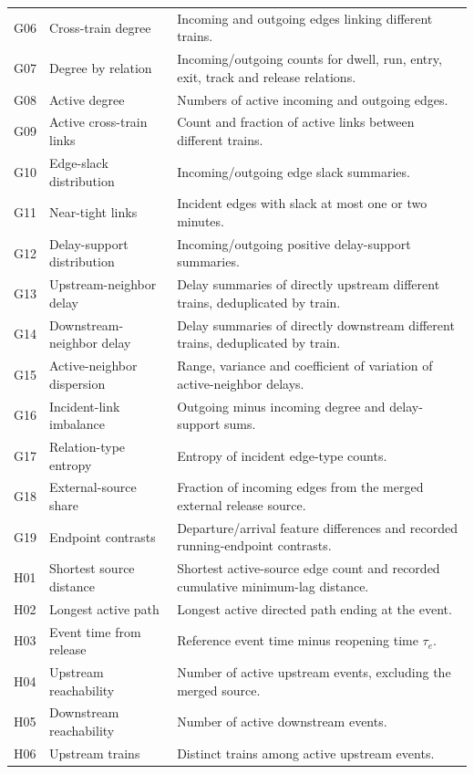 \begin{longtable}{@{}>{\raggedright\arraybackslash}p{0.8cm}>{\raggedright\arraybackslash}p{3.7cm}>{\raggedright\arraybackslash}p{10.0cm}@{}}
G06 & Cross-train degree & Incoming and outgoing edges linking different trains. \\
G07 & Degree by relation & Incoming/outgoing counts for dwell, run, entry, exit, track and release relations. \\
G08 & Active degree & Numbers of active incoming and outgoing edges. \\
G09 & Active cross-train links & Count and fraction of active links between different trains. \\
G10 & Edge-slack distribution & Incoming/outgoing edge slack summaries. \\
G11 & Near-tight links & Incident edges with slack at most one or two minutes. \\
G12 & Delay-support distribution & Incoming/outgoing positive delay-support summaries. \\
G13 & Upstream-neighbor delay & Delay summaries of directly upstream different trains, deduplicated by train. \\
G14 & Downstream-neighbor delay & Delay summaries of directly downstream different trains, deduplicated by train. \\
G15 & Active-neighbor dispersion & Range, variance and coefficient of variation of active-neighbor delays. \\
G16 & Incident-link imbalance & Outgoing minus incoming degree and delay-support sums. \\
G17 & Relation-type entropy & Entropy of incident edge-type counts. \\
G18 & External-source share & Fraction of incoming edges from the merged external release source. \\
G19 & Endpoint contrasts & Departure/arrival feature differences and recorded running-endpoint contrasts. \\
H01 & Shortest source distance & Shortest active-source edge count and recorded cumulative minimum-lag distance. \\
H02 & Longest active path & Longest active directed path ending at the event. \\
H03 & Event time from release & Reference event time minus reopening time $\tau_e$. \\
H04 & Upstream reachability & Number of active upstream events, excluding the merged source. \\
H05 & Downstream reachability & Number of active downstream events. \\
H06 & Upstream trains & Distinct trains among active upstream events. \\

\end{longtable}
